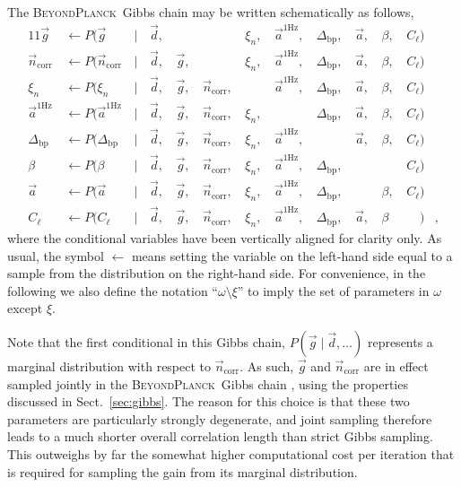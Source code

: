 \documentclass[onecolumn]{aa}
\renewcommand{\d}[0]{\vec{d}}
\newcommand{\n}[0]{\vec{n}}
\renewcommand{\a}[0]{\vec{a}}
\newcommand{\g}[0]{\vec{g}}
\newcommand{\Dbp}[0]{\Delta_{\mathrm{bp}}}
\newcommand{\BP}{\textsc{BeyondPlanck}}
\begin{document}
The \BP\ Gibbs chain may be written schematically as follows,
\begin{alignat}{11}
\g &\,\leftarrow P(\g&\,\mid &\,\d,&\, & &\,\xi_n, &\,\a^{\mathrm{1Hz}}, &\,\Dbp, &\,\a, &\,\beta, &\,C_{\ell})\\
\n_{\mathrm{corr}} &\,\leftarrow P(\n_{\mathrm{corr}}&\,\mid &\,\d, &\,\g, &\,&\,\xi_n,
&\,\a^{\mathrm{1Hz}}, &\,\Dbp, &\,\a, &\,\beta, &\,C_{\ell})\\
\xi_n &\,\leftarrow P(\xi_n&\,\mid &\,\d, &\,\g, &\,\n_{\mathrm{corr}}, &\,
&\,\a^{\mathrm{1Hz}}, &\,\Dbp, &\,\a, &\,\beta, &\,C_{\ell})\\
\a^{\mathrm{1Hz}} &\,\leftarrow P(\a^{\mathrm{1Hz}}&\,\mid &\,\d,
&\,\g, &\,\n_{\mathrm{corr}}, &\,\xi_n, &\,
&\,\Dbp, &\,\a, &\,\beta, &\,C_{\ell})\\
\Dbp &\,\leftarrow P(\Dbp&\,\mid &\,\d, &\,\g, &\,\n_{\mathrm{corr}}, &\,\xi_n,
&\,\a^{\mathrm{1Hz}}, &\,&\,\a, &\,\beta, &\,C_{\ell})\\
\beta &\,\leftarrow P(\beta&\,\mid &\,\d, &\,\g, &\,\n_{\mathrm{corr}}, &\,\xi_n,
&\,\a^{\mathrm{1Hz}}, &\,\Dbp, & &\,&\,C_{\ell})\\
\a &\,\leftarrow P(\a&\,\mid &\,\d, &\,\g, &\,\n_{\mathrm{corr}}, &\,\xi_n,
&\,\a^{\mathrm{1Hz}}, &\,\Dbp, &\,&\,\beta, &\,C_{\ell})\\
C_{\ell} &\,\leftarrow P(C_{\ell}&\,\mid &\,\d, &\,\g, &\,\n_{\mathrm{corr}}, &\,\xi_n,
&\,\a^{\mathrm{1Hz}}, &\,\Dbp, &\,\a, &\,\beta&\,\phantom{C_{\ell}})&,
\end{alignat}
where the conditional variables have been vertically aligned for
clarity only.  As usual, the symbol $\leftarrow$ means setting the
variable on the left-hand side equal to a sample from the distribution
on the right-hand side. For convenience, in the following we also
define the notation ``$\omega\setminus \xi$'' to imply the set of
parameters in $\omega$ except $\xi$.

Note that the first conditional in this Gibbs chain, ${P(\g\mid
  \d,\ldots)}$ represents a marginal distribution with respect to
$\n_{\mathrm{corr}}$. As such, $\g$ and $\n_{\mathrm{corr}}$ are in
effect sampled jointly in the \BP\ Gibbs chain \citep{bp07,bp06},
using the properties discussed in Sect.~\ref{sec:gibbs}. The reason
for this choice is that these two parameters are particularly strongly
degenerate, and joint sampling therefore leads to a much shorter
overall correlation length than strict Gibbs sampling. This outweighs
by far the somewhat higher computational cost per iteration that is
required for sampling the gain from its marginal distribution.
\end{document}
